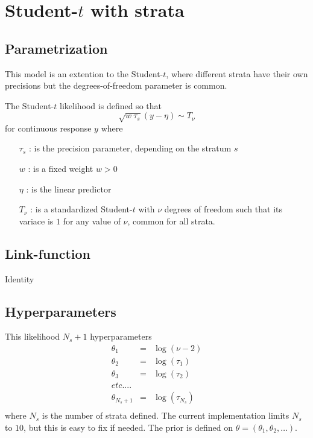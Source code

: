 \documentclass[a4paper,11pt]{article}
\begin{document}
\section*{Student-$t$ with strata}

\subsection*{Parametrization}

This model is an extention to the Student-$t$, where different strata
have their own precisions but the degrees-of-freedom parameter is
common.

The Student-$t$ likelihood is defined so that 
\[
\sqrt{w\ \tau_{s}}(y - \eta)\sim T_{\nu}
\]
for continuous response $y$ where
\begin{itemize}
\item[$\tau_{s}$]: is the precision parameter, depending on the
    stratum $s$
\item[$w$]: is a fixed weight $w>0$
\item[$\eta$]: is the linear predictor
\item[$T_{\nu}$]: is a standardized Student-$t$ with $\nu$ degrees of
    freedom such that its variace is $1$ for any value of $\nu$,
    common for all strata.
\end{itemize}
\subsection*{Link-function}

Identity

\subsection*{Hyperparameters}

This likelihood $N_{s}+1$ hyperparameters
\begin{eqnarray*}
    \theta_1 &=& \log(\nu-2)\\
    \theta_2 &=& \log(\tau_{1})\\
    \theta_3 &=& \log(\tau_{2})\\
    etc....\\
    \theta_{N_{s}+1} &=& \log(\tau_{N_{s}})\\
\end{eqnarray*}
where $N_{s}$ is the number of strata defined.  The current
implementation limits $N_{s}$ to $10$, but this is easy to fix if
needed.  The prior is defined on $\theta=(\theta_1,\theta_2, \ldots)$.
\end{document}
